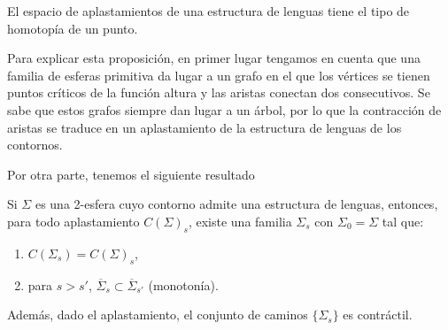 \documentclass[twoside, 11pt]{article}
\begin{document}
\begin{prop}
El espacio de aplastamientos de una estructura de lenguas tiene el tipo de homotopía de un punto.
\end{prop}

Para explicar esta proposición, en primer lugar tengamos en cuenta que una familia de esferas primitiva da lugar a un grafo en el que los vértices se tienen puntos críticos de la función altura y las aristas conectan dos consecutivos. Se sabe que estos grafos siempre dan lugar a un árbol, por lo que la contracción de aristas se traduce en un aplastamiento de la estructura de lenguas de los contornos. 

Por otra parte, tenemos el siguiente resultado 

\begin{prop}\label{monotono}
Si $\Sigma$ es una 2-esfera cuyo contorno admite una estructura de lenguas, entonces, para todo aplastamiento $C(\Sigma)_s$, existe una familia $\Sigma_s$ con $\Sigma_0=\Sigma$ tal que:
\begin{enumerate}
\item $C(\Sigma_s)=C(\Sigma)_s$,
\item para $s>s'$, $\overline{\Sigma}_s\subset\overline{\Sigma}_{s'}$ (monotonía).
\end{enumerate} 
Además, dado el aplastamiento, el conjunto de caminos $\{\Sigma_s\}$ es contráctil. 
\end{prop}
\end{document}
